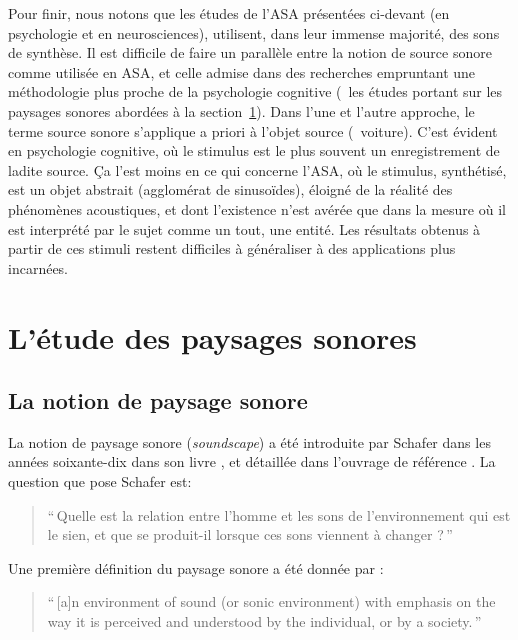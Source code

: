 Pour finir, nous notons que les études de l'ASA présentées ci-devant (en psychologie et en neurosciences), utilisent, dans leur immense majorité, des sons de synthèse. Il est difficile de faire un parallèle entre la notion de source sonore comme utilisée en ASA, et celle admise dans des recherches empruntant une méthodologie plus proche de la psychologie cognitive (\cf~les études portant sur les paysages sonores abordées à la section~\ref{sec:ch3_paysageSonore}). Dans l'une et l'autre approche, le terme source sonore s'applique a priori à l'objet source (\eg~voiture). C'est évident en psychologie cognitive, où le stimulus est le plus souvent un enregistrement de ladite source. Ça l'est moins en ce qui concerne l'ASA, où le stimulus, synthétisé, est un objet abstrait (agglomérat de sinusoïdes), éloigné de la réalité des phénomènes acoustiques, et dont l'existence n'est avérée que dans la mesure où il est interprété par le sujet comme un tout, une entité. Les résultats obtenus à partir de ces stimuli restent difficiles à généraliser à des applications plus incarnées.

\section{L'étude des paysages sonores}
\label{sec:ch3_paysageSonore}

\subsection{La notion de paysage sonore}

La notion de paysage sonore (\emph{soundscape}) a été introduite par Schafer dans les années soixante-dix dans son livre \citep{schafer1969new}, et détaillée dans l'ouvrage de référence \citep{schafer1977tuning}. La question que pose Schafer est:

\begin{quote}
``\,Quelle est la relation entre l'homme et les sons de l'environnement qui est le sien, et que se produit-il lorsque ces sons viennent à changer ?\,''
\end{quote}

Une première définition du paysage sonore a été donnée par \citep{truax1978handbook}:

\begin{quote}
``\,[a]n environment of sound (or sonic environment) with emphasis on the way it is perceived and understood by the individual, or by a society.\,'' 
\end{quote}

